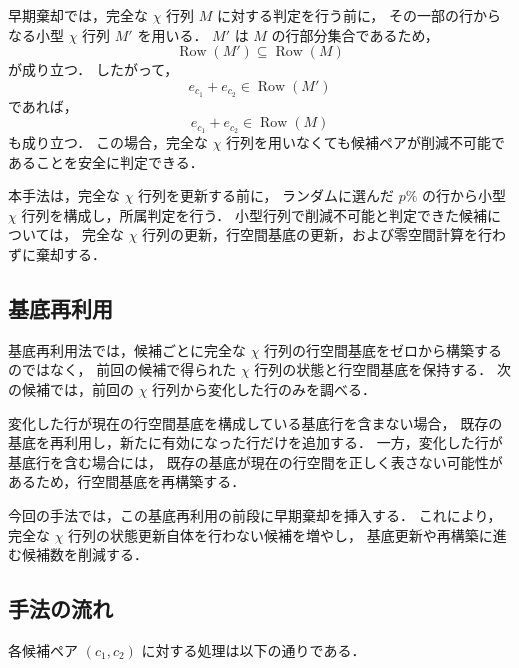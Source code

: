 早期棄却では，完全な $\chi$ 行列 $M$ に対する判定を行う前に，
その一部の行からなる小型 $\chi$ 行列 $M'$ を用いる．
$M'$ は $M$ の行部分集合であるため，
\[
    \operatorname{Row}(M') \subseteq \operatorname{Row}(M)
\]
が成り立つ．
したがって，
\[
    e_{c_1}+e_{c_2} \in \operatorname{Row}(M')
\]
であれば，
\[
    e_{c_1}+e_{c_2} \in \operatorname{Row}(M)
\]
も成り立つ．
この場合，完全な $\chi$ 行列を用いなくても候補ペアが削減不可能であることを安全に判定できる．

本手法は，完全な $\chi$ 行列を更新する前に，
ランダムに選んだ $p\%$ の行から小型 $\chi$ 行列を構成し，所属判定を行う．
小型行列で削減不可能と判定できた候補については，
完全な $\chi$ 行列の更新，行空間基底の更新，および零空間計算を行わずに棄却する．

\subsection{基底再利用}

基底再利用法では，候補ごとに完全な $\chi$ 行列の行空間基底をゼロから構築するのではなく，
前回の候補で得られた $\chi$ 行列の状態と行空間基底を保持する．
次の候補では，前回の $\chi$ 行列から変化した行のみを調べる．

変化した行が現在の行空間基底を構成している基底行を含まない場合，
既存の基底を再利用し，新たに有効になった行だけを追加する．
一方，変化した行が基底行を含む場合には，
既存の基底が現在の行空間を正しく表さない可能性があるため，行空間基底を再構築する．

今回の手法では，この基底再利用の前段に早期棄却を挿入する．
これにより，完全な $\chi$ 行列の状態更新自体を行わない候補を増やし，
基底更新や再構築に進む候補数を削減する．

\subsection{手法の流れ}

各候補ペア $(c_1,c_2)$ に対する処理は以下の通りである．

